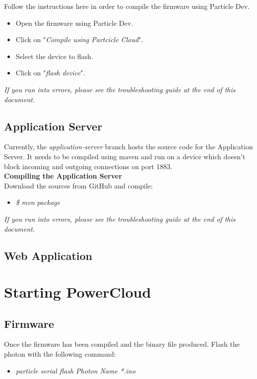 \documentclass[a4paper,10pt]{article}
\begin{document}
	Follow the instructions here in order to compile the firmware using Particle 
	Dev.
	\\
	\begin{itemize}
		\item Open the firmware using Particle Dev.
		\item Click on "\textit{Compile using Partcicle Cloud}".
		\item Select the device to flash.
		\item Click on "\textit{flash device}".
	\end{itemize}
	
	\textit{If you run into errors, please see the troubleshooting guide at the end of this document.}
	
	\subsection{Application Server}
	Currently, the \textit{application-server} branch hosts the source code for 
	the Application Server. It needs to be compiled using maven and run on a 
	device which doesn't block incoming and outgoing connections on port 1883.\\
	
	\textbf{Compiling the Application Server}\\
	Download the sources from GitHub and compile:\\
	
	\begin{itemize}
		\item \textit{\$ mvn package}
	\end{itemize}		
	
	\textit{If you run into errors, please see the troubleshooting guide at the end of this document.}
	\newpage
	\subsection{Web Application}
	
	\newpage
	\section{Starting PowerCloud}
	\subsection{Firmware}
	Once the firmware has been compiled and the binary file produced. Flash the photon with the following command:
	
	\begin{itemize}
		\item \textit{particle serial flash Photon Name *.ino}
	\end{itemize}
	
\end{document}
